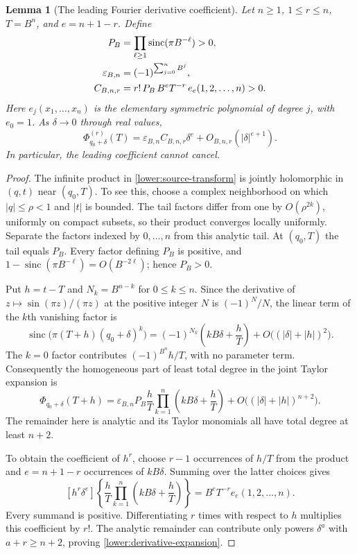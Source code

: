 \documentclass[11pt,letterpaper]{article}
\newtheorem{lemma}[theorem]{Lemma}
\theoremstyle{definition}
\theoremstyle{remark}
\newcommand{\sinc}{\operatorname{sinc}}
\begin{document}
\begin{lemma}[The leading Fourier derivative coefficient]
\label{lower:coefficient}
Let $n\ge1$, $1\le r\le n$, $T=B^n$, and $e=n+1-r$.  Define
\begin{align}
 P_B&=\prod_{\ell\ge1}\sinc(\pi B^{-\ell})>0,
 \label{lower:tail-product}\\
 \varepsilon_{B,n}&=(-1)^{\sum_{j=0}^nB^j},\notag\\
 C_{B,n,r}&=r!\,P_B\,B^eT^{-r}\,e_e(1,2,\ldots,n)>0.
 \label{lower:coefficient-constant}
\end{align}
Here $e_j(x_1,\ldots,x_n)$ is the elementary symmetric polynomial of
degree $j$, with $e_0=1$.  As $\delta\to0$ through real values,
\begin{equation}\label{lower:derivative-expansion}
 \Phi_{q_0+\delta}^{(r)}(T)
 =\varepsilon_{B,n}C_{B,n,r}\delta^e
       +O_{B,n,r}(|\delta|^{e+1}).
\end{equation}
In particular, the leading coefficient cannot cancel.
\end{lemma}

\begin{proof}
The infinite product in \eqref{lower:source-transform} is jointly
holomorphic in $(q,t)$ near $(q_0,T)$.  To see this, choose a complex
neighborhood on which $|q|\le\rho<1$ and $|t|$ is bounded.  The tail
factors differ from one by $O(\rho^{2k})$, uniformly on compact
subsets, so their product converges locally uniformly.  Separate the
factors indexed by $0,\ldots,n$ from this analytic tail.  At $(q_0,T)$
the tail equals $P_B$.  Every factor defining $P_B$ is positive, and
$1-\sinc(\pi B^{-\ell})=O(B^{-2\ell})$; hence $P_B>0$.

Put $h=t-T$ and $N_k=B^{n-k}$ for $0\le k\le n$.  Since the derivative
of $z\mapsto\sin(\pi z)/(\pi z)$ at the positive integer $N$ is
$(-1)^N/N$, the linear term of the $k$th vanishing factor is
\[
 \sinc\bigl(\pi(T+h)(q_0+\delta)^k\bigr)
 =(-1)^{N_k}\left(kB\delta+\frac hT\right)
       +O\bigl((|\delta|+|h|)^2\bigr).
\]
The $k=0$ factor contributes $(-1)^{B^n}h/T$, with no parameter term.
Consequently the homogeneous part of least total degree in the joint
Taylor expansion is
\begin{equation}\label{lower:joint-polynomial}
 \Phi_{q_0+\delta}(T+h)
 =\varepsilon_{B,n}P_B\frac hT
       \prod_{k=1}^n\left(kB\delta+\frac hT\right)
       +O\bigl((|\delta|+|h|)^{n+2}\bigr).
\end{equation}
The remainder here is analytic and its Taylor monomials all have total
degree at least $n+2$.

To obtain the coefficient of $h^r$, choose $r-1$ occurrences of $h/T$
from the product and $e=n+1-r$ occurrences of $kB\delta$.  Summing over
the latter choices gives
\[
 [h^r\delta^e]\left\{\frac hT
       \prod_{k=1}^n\left(kB\delta+\frac hT\right)\right\}
 =B^eT^{-r}e_e(1,2,\ldots,n).
\]
Every summand is positive.  Differentiating $r$ times with respect to
$h$ multiplies this coefficient by $r!$.  The analytic remainder can
contribute only powers $\delta^a$ with $a+r\ge n+2$, proving
\eqref{lower:derivative-expansion}.
\end{proof}
\end{document}
